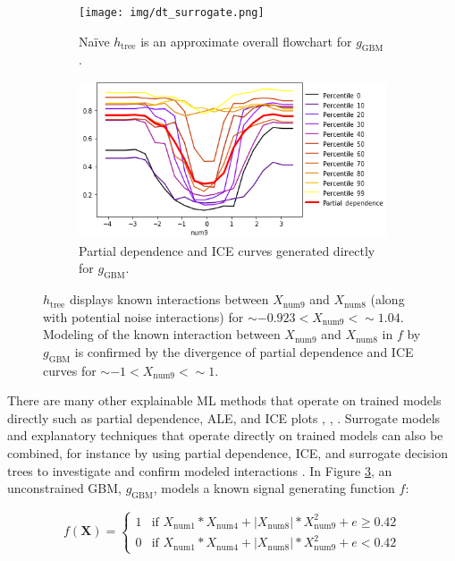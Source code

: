 \documentclass[fleqn]{article}
\newcommand{\twopartdef}[4]
{
	\left\{
		\begin{array}{ll}
			#1 & \mbox{if } #2 \\
			#3 & \mbox{if } #4
		\end{array}
	\right.
}
\begin{document}
\begin{figure}[htb!]
	\begin{subfigure}{.55\textwidth}
		\texttt{[image: img/dt\_surrogate.png]}
  		\caption{Na\"ive $h_{\text{tree}}$ is an approximate overall flowchart for $g_{\text{GBM}}$.}
  		\label{fig:dt_surrogate}
	\end{subfigure}\hspace{5pt}
	\begin{subfigure}{.45\textwidth}
  		\includegraphics[height=.52\linewidth, width=1.02\linewidth]{img/pdp_ice.png}
  		\caption{Partial dependence and ICE curves generated directly for $g_{\text{GBM}}$.}
  		\label{fig:pdp_ice}
	\end{subfigure}
	\caption{$h_{\text{tree}}$ displays known interactions between $X_{\text{num9}}$ and $X_{\text{num8}}$ (along with potential noise interactions) for $\sim -0.923 < X_{\text{num9}} <  \sim 1.04$. Modeling of the known interaction between $X_{\text{num9}}$ and $X_{\text{num8}}$ in $f$ by $g_{\text{GBM}}$ is confirmed by the divergence of partial dependence and ICE curves for $\sim -1 < X_{\text{num9}} <  \sim 1$.}
	\label{fig:pdp_ice_dt_surrogate}
\end{figure}

There are many other explainable ML methods that operate on trained models directly such as partial dependence, ALE, and ICE plots \cite{ale_plot}, \cite{esl}, \cite{ice_plots}. Surrogate models and explanatory techniques that operate directly on trained models can also be combined, for instance by using partial dependence, ICE, and surrogate decision trees to investigate and confirm modeled interactions \cite{art_and_sci}. In Figure \ref{fig:pdp_ice_dt_surrogate}, an unconstrained GBM, $g_{\text{GBM}}$, models a known signal generating function $f$:

\begin{equation}
\label{eq:f}
f(\mathbf{X}) = \twopartdef {1} {X_{\text{num}1} * X_{\text{num}4} + |X_{\text{num}8}| * X_{\text{num}9}^2 + e \geq 0.42} {0} {X_{\text{num}1} * X_{\text{num}4} + |X_{\text{num}8}| * X_{\text{num}9}^2 + e < 0.42}
\end{equation}
\end{document}
